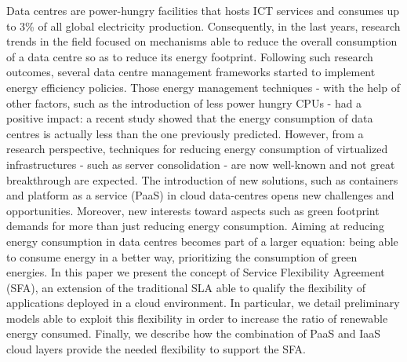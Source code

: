 

Data centres are power-hungry facilities that hosts ICT services and consumes up to 3\% of all global electricity production.
Consequently, in the last years, research trends in the field focused on mechanisms able to reduce the overall consumption of a data centre so as to reduce its energy footprint.
Following such research outcomes, several data centre management frameworks started to implement energy efficiency policies.
Those energy management techniques - with the help of other factors, such as the introduction of less power hungry CPUs - had a positive impact: a recent study showed that the energy consumption of data centres is actually less than the one previously predicted.
However, from a research perspective, techniques for reducing energy consumption of virtualized infrastructures - such as server consolidation - are now well-known and not great breakthrough are expected.
The introduction of new solutions, such as containers and platform as a service (PaaS) in cloud data-centres opens new challenges and opportunities.
Moreover, new interests toward aspects such as green footprint demands for more than just reducing energy consumption. 
Aiming at reducing energy consumption in data centres becomes part of a larger equation: being able to consume energy in a better way, prioritizing the consumption of green energies.
In this paper we present the concept of Service Flexibility Agreement (SFA), an extension of the traditional SLA able to qualify the flexibility of applications deployed in a cloud environment.
In particular, we detail preliminary models able to exploit this flexibility in order to increase the ratio of renewable energy consumed.
Finally, we describe how the combination of PaaS and IaaS cloud layers provide the needed flexibility to support the SFA.
